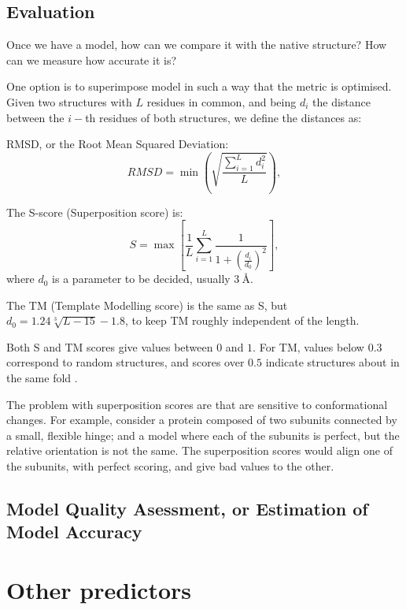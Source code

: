 

\subsection{Evaluation}
Once we have a model, how can we compare it with the native structure? How can we measure how accurate it is?

One option is to superimpose model 
in such a way that the metric is optimised.
Given two structures with $L$ residues in common, and being $d_i$ the distance between the $i-$th residues of both structures, we define the distances as:

RMSD, or the Root Mean Squared Deviation:
\begin{equation*}
RMSD = \min \left(\sqrt{\frac{\sum_{i=1}^L d_i^2}{L}}\right),
\end{equation*}

The S-score (Superposition score) is:
\begin{equation*}
S = \max\left[\frac{1}{L} \sum_{i=1}^L \frac{1}{1 + \left(\frac{d_i}{d_0}\right)^2}\right],
\end{equation*}
where $d_0$ is a parameter to be decided, usually $\SI{3}{\angstrom}$.

The TM (Template Modelling score) is the same as S, but $d_0 = 1.24 \sqrt[3]{L - 15} - 1.8$, to keep TM roughly independent of the length.

Both S and TM scores give values between $0$ and $1$.
For TM, values below $0.3$ correspond to random structures, and scores over $0.5$ indicate structures about in the same fold \citep{tmscore05}.

The problem with superposition scores are that are sensitive to conformational changes.
For example, consider a protein composed of two subunits connected by a small, flexible hinge; and a model where each of the subunits is perfect, but the relative orientation is not the same.
The superposition scores would align one of the subunits, with perfect scoring, and give bad values to the other. 


\subsection{Model Quality Asessment, or Estimation of Model Accuracy}

\section{Other predictors}

